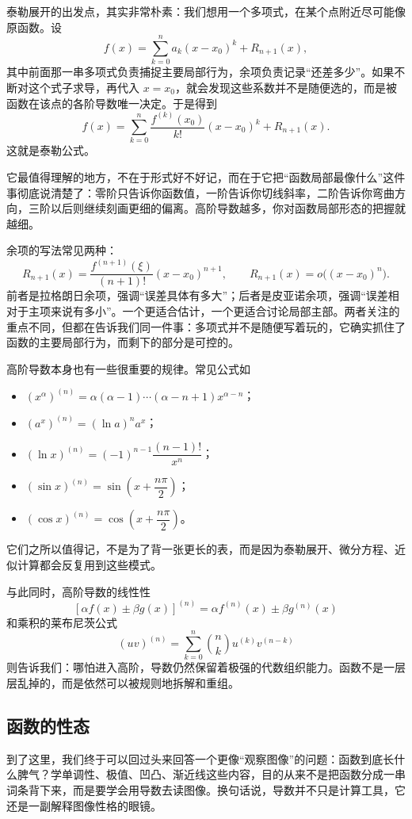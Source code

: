 \documentclass[UTF8]{ctexbook}
\begin{document}
泰勒展开的出发点，其实非常朴素：我们想用一个多项式，在某个点附近尽可能像原函数。设
\[
f(x)=\sum_{k=0}^{n}a_k(x-x_0)^k+R_{n+1}(x),
\]
其中前面那一串多项式负责捕捉主要局部行为，余项负责记录“还差多少”。如果不断对这个式子求导，再代入 $x=x_0$，就会发现这些系数并不是随便选的，而是被函数在该点的各阶导数唯一决定。于是得到
\[
f(x)=\sum_{k=0}^{n}\frac{f^{(k)}(x_0)}{k!}(x-x_0)^k+R_{n+1}(x).
\]
这就是泰勒公式。

它最值得理解的地方，不在于形式好不好记，而在于它把“函数局部最像什么”这件事彻底说清楚了：零阶只告诉你函数值，一阶告诉你切线斜率，二阶告诉你弯曲方向，三阶以后则继续刻画更细的偏离。高阶导数越多，你对函数局部形态的把握就越细。

余项的写法常见两种：
\[
R_{n+1}(x)=\frac{f^{(n+1)}(\xi)}{(n+1)!}(x-x_0)^{n+1},
\qquad
R_{n+1}(x)=o\bigl((x-x_0)^n\bigr).
\]
前者是拉格朗日余项，强调“误差具体有多大”；后者是皮亚诺余项，强调“误差相对于主项来说有多小”。一个更适合估计，一个更适合讨论局部主部。两者关注的重点不同，但都在告诉我们同一件事：多项式并不是随便写着玩的，它确实抓住了函数的主要局部行为，而剩下的部分是可控的。

高阶导数本身也有一些很重要的规律。常见公式如
\begin{itemize}
  \item $(x^\alpha)^{(n)}=\alpha(\alpha-1)\cdots(\alpha-n+1)x^{\alpha-n}$；
  \item $(a^x)^{(n)}=(\ln a)^n a^x$；
  \item $(\ln x)^{(n)}=(-1)^{n-1}\dfrac{(n-1)!}{x^n}$；
  \item $(\sin x)^{(n)}=\sin\!\left(x+\dfrac{n\pi}{2}\right)$；
  \item $(\cos x)^{(n)}=\cos\!\left(x+\dfrac{n\pi}{2}\right)$。
\end{itemize}
它们之所以值得记，不是为了背一张更长的表，而是因为泰勒展开、微分方程、近似计算都会反复用到这些模式。

与此同时，高阶导数的线性性
\[
[\alpha f(x)\pm \beta g(x)]^{(n)}=\alpha f^{(n)}(x)\pm \beta g^{(n)}(x)
\]
和乘积的莱布尼茨公式
\[
(uv)^{(n)}=\sum_{k=0}^{n}\binom{n}{k}u^{(k)}v^{(n-k)}
\]
则告诉我们：哪怕进入高阶，导数仍然保留着极强的代数组织能力。函数不是一层层乱掉的，而是依然可以被规则地拆解和重组。

\subsection{函数的性态}
到了这里，我们终于可以回过头来回答一个更像“观察图像”的问题：函数到底长什么脾气？学单调性、极值、凹凸、渐近线这些内容，目的从来不是把函数分成一串词条背下来，而是要学会用导数去读图像。换句话说，导数并不只是计算工具，它还是一副解释图像性格的眼镜。
\end{document}
